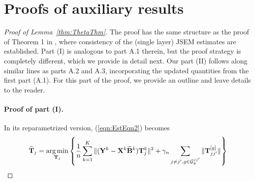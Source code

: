 \section{Proofs of auxiliary results}

\begin{proof}[Proof of Lemma~\ref{thm:ThetaThm}]
The proof has the same structure as the proof of Theorem 1 in \cite{MaMichailidis15}, where consistency of the (single layer) JSEM estimates are established. Part (I) is analogous to part A.1 therein, but the proof strategy is completely different, which we provide in detail next. Our part (II) follows along similar lines as parts A.2 and A.3, incorporating the updated quantities from the first part (A.1). For this part of the proof, we provide an outline and leave details to the reader.

\paragraph{Proof of part (I).}
%
In its reparametrized version, (\ref{eqn:EstEqn2}) becomes
%
\begin{align}
\widehat {{\mathbf{T}}}_j = \operatorname*{arg\,min}_{{\mathbf{T}}_j} \left\{ \frac{1}{n} \sum_{k=1}^K \| ({\mathbf{Y}}^k - {\mathbf{X}}^k \widehat {{\mathbf{B}}}^k) {\mathbf{T}}_j^k \|^2 + \gamma_n \sum_{j \neq j', g \in {\cal{G}}_y^{jj'}} \| {\mathbf{T}}_{jj'}^{[g]} \| \right\}
\end{align}

\end{proof}
